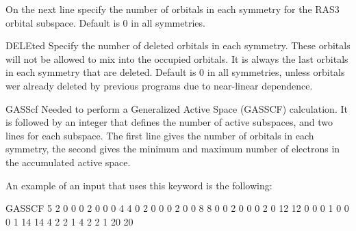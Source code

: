 \begin{keywordlist}
On the next line specify the number of orbitals in each symmetry
for the RAS3 orbital subspace. Default is 0 in all symmetries.
\item[DELEted]
Specify the number of deleted orbitals in each
symmetry. These orbitals will not be allowed to mix into the occupied
orbitals. It is always the last orbitals in each symmetry that are deleted.
Default is 0 in all symmetries, unless orbitals wer already deleted by previous
programs due to near-linear dependence.
\item[GASScf]
Needed to perform a Generalized Active Space (GASSCF) calculation.
It is followed by an integer that defines the number of active subspaces,
and two lines for each subspace. The first line gives the number of orbitals
in each symmetry, the second gives the minimum and maximum number of
electrons in the accumulated active space.

An example of an input that uses this keyword is the following:

\begin{inputlisting}
GASSCF
 5
 2 0 0 0 2 0 0 0
 4 4
 0 2 0 0 0 2 0 0
 8 8
 0 0 2 0 0 0 2 0
 12 12
 0 0 0 1 0 0 0 1
 14 14
 4 2 2 1 4 2 2 1
 20 20
\end{inputlisting}


\end{keywordlist}
